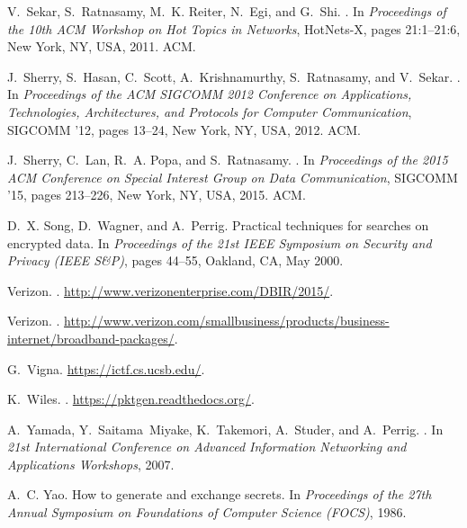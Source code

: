 \documentclass[letterpaper,twocolumn,10pt]{article}
\providecommand{\DIFaddbegin}{} %
\begin{document}
{\begin{thebibliography}{10}
V.~Sekar, S.~Ratnasamy, M.~K. Reiter, N.~Egi, and G.~Shi.
.
\newblock In {\em Proceedings of the 10th {ACM} Workshop on Hot Topics in
  Networks}, {HotNets}-X, pages 21:1--21:6, New York, {NY}, {USA}, 2011. {ACM}.

J.~Sherry, S.~Hasan, C.~Scott, A.~Krishnamurthy, S.~Ratnasamy, and V.~Sekar.
.
\newblock In {\em Proceedings of the ACM SIGCOMM 2012 Conference on
  Applications, Technologies, Architectures, and Protocols for Computer
  Communication}, SIGCOMM '12, pages 13--24, New York, NY, USA, 2012. ACM.

J.~Sherry, C.~Lan, R.~A. Popa, and S.~Ratnasamy.
.
\newblock In {\em Proceedings of the 2015 ACM Conference on Special Interest
  Group on Data Communication}, SIGCOMM '15, pages 213--226, New York, NY, USA,
  2015. ACM.

D.~X. Song, D.~Wagner, and A.~Perrig.
\newblock Practical techniques for searches on encrypted data.
\newblock In {\em Proceedings of the 21st IEEE Symposium on Security and
  Privacy ({IEEE S\&P})}, pages 44--55, Oakland, CA, May 2000.

{Verizon}.
.
\newblock \url{http://www.verizonenterprise.com/DBIR/2015/}.

{Verizon}.
.
\newblock
  \url{http://www.verizon.com/smallbusiness/products/business-internet/broadband-packages/}.

G.~Vigna.
\newblock \url{https://ictf.cs.ucsb.edu/}.

K.~Wiles.
.
\newblock \url{https://pktgen.readthedocs.org/}.

A.~Yamada, Y.~Saitama~Miyake, K.~Takemori, A.~Studer, and A.~Perrig.
.
\newblock In {\em 21st International Conference on Advanced Information
  Networking and Applications Workshops}, 2007.

A.~C. Yao.
\newblock How to generate and exchange secrets.
\newblock In {\em Proceedings of the 27th Annual Symposium on Foundations of
  Computer Science ({FOCS})}, 1986.
\DIFaddbegin 


\end{thebibliography}}
\end{document}
